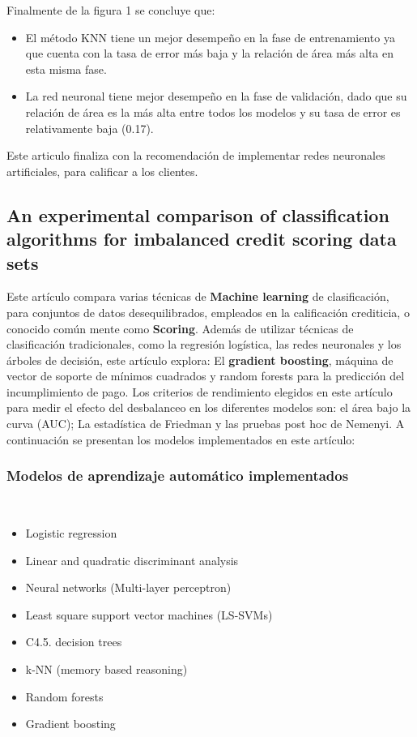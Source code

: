 \documentclass[conference]{IEEEtran}
\begin{document}
Finalmente de la figura 1 se concluye que:
\begin{itemize}
\item El método KNN tiene un mejor desempeño en la fase de entrenamiento ya que cuenta con la tasa de error más baja y la relación de área más alta en esta misma fase. 
\item La red neuronal tiene mejor desempeño en la fase de validación, dado que su relación de área es la más alta entre todos los modelos y su tasa de error es relativamente baja (0.17).
\end{itemize}
Este articulo finaliza con la recomendación de implementar redes neuronales artificiales, para calificar a los clientes.

\subsection{An experimental comparison of classification algorithms for imbalanced credit scoring data sets}

Este artículo  \cite{articulo2} compara varias técnicas de \textbf{Machine learning}  de clasificación, para conjuntos de datos desequilibrados,  empleados en la calificación crediticia, o conocido común mente como \textbf{Scoring}.
Además de utilizar técnicas de clasificación tradicionales, como la regresión logística, las redes neuronales y los árboles de decisión, este artículo explora: El \textbf{gradient boosting}, máquina de vector de soporte de mínimos cuadrados y random forests para la predicción del incumplimiento de pago.
Los criterios de rendimiento elegidos en este artículo para medir el efecto del desbalanceo en los diferentes modelos son: el área bajo la curva (AUC); La estadística de Friedman y las pruebas post hoc de Nemenyi.
A continuación se presentan los modelos implementados en este artículo:
\subsubsection{Modelos de aprendizaje automático implementados} \hfill\\
\begin{itemize}
\item Logistic regression
\item Linear and quadratic discriminant analysis
\item Neural networks (Multi-layer perceptron)
\item Least square support vector machines (LS-SVMs)
\item C4.5. decision trees
\item k-NN (memory based reasoning)
\item Random forests
\item Gradient boosting
\end{itemize}
\end{document}
